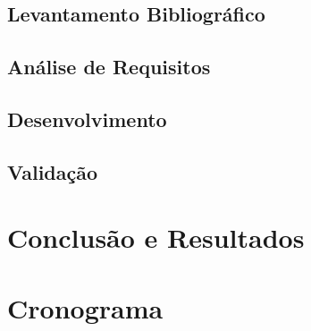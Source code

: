 \documentclass[12pt]{article}
\begin{document}
\subsection{Levantamento Bibliográfico}
\subsection{Análise de Requisitos}
\subsection{Desenvolvimento}
\subsection{Validação}

\section{Conclusão e Resultados}\label{sec:figs}

\section{Cronograma}\label{sec:figs}




\end{document}
